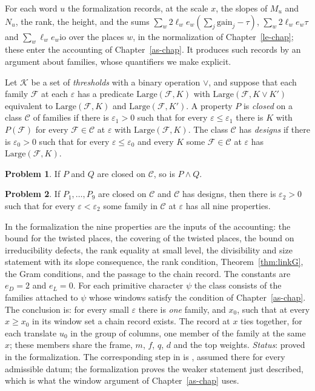 \documentclass[reqno]{amsart}
\newcounter{chap}
\theoremstyle{definition}
\newtheorem{problem}{Problem}[section]
\theoremstyle{plain}
\theoremstyle{remark}
\newcommand{\gain}{\mathrm{gain}}
\newcommand{\io}{\mathrm{io}}
\begin{document}
For each word \(u\) the formalization records, at the scale \(x\), the slopes of \(M_u\) and \(N_u\), the rank, the height, and the sums \(\sum_w2\ell_we_w(\sum_j\gain_j-\tau)\), \(\sum_w2\ell_we_w\tau\) and \(\sum_w\ell_we_w\io\) over the places \(w\), in the normalization of Chapter~\ref{le-chap}; these enter the accounting of Chapter~\ref{as-chap}.  It produces such records by an argument about families, whose quantifiers we make explicit.

Let \(\mathcal K\) be a set of \emph{thresholds} with a binary operation \(\vee\), and suppose that each family \(\mathcal F\) at each \(\varepsilon\) has a predicate \(\mathrm{Large}(\mathcal F,K)\) with \(\mathrm{Large}(\mathcal F,K\vee K')\) equivalent to \(\mathrm{Large}(\mathcal F,K)\) and \(\mathrm{Large}(\mathcal F,K')\).  A property \(P\) is \emph{closed} on a class \(\mathcal C\) of families if there is \(\varepsilon_1>0\) such that for every \(\varepsilon\le\varepsilon_1\) there is \(K\) with \(P(\mathcal F)\) for every \(\mathcal F\in\mathcal C\) at \(\varepsilon\) with \(\mathrm{Large}(\mathcal F,K)\).  The class \(\mathcal C\) has \emph{designs} if there is \(\varepsilon_0>0\) such that for every \(\varepsilon\le\varepsilon_0\) and every \(K\) some \(\mathcal F\in\mathcal C\) at \(\varepsilon\) has \(\mathrm{Large}(\mathcal F,K)\).

\begin{problem}\label{pr:closed-and}
If \(P\) and \(Q\) are closed on \(\mathcal C\), so is \(P\wedge Q\).
\end{problem}

\begin{problem}\label{pr:design}
If \(P_1,\dots,P_9\) are closed on \(\mathcal C\) and \(\mathcal C\) has designs, then there is \(\varepsilon_2>0\) such that for every \(\varepsilon<\varepsilon_2\) some family in \(\mathcal C\) at \(\varepsilon\) has all nine properties.
\end{problem}

In the formalization the nine properties are the inputs of the accounting: the bound for the twisted places, the covering of the twisted places, the bound on irreducibility defects, the rank equality at small level, the divisibility and size statement with its slope consequence, the rank condition, Theorem~\ref{thm:linkG}, the Gram conditions, and the passage to the chain record.  The constants are \(e_D=2\) and \(e_L=0\).  For each primitive character \(\psi\) the class consists of the families attached to \(\psi\) whose windows satisfy the condition of Chapter~\ref{as-chap}.  The conclusion is: for every small \(\varepsilon\) there is \emph{one} family, and \(x_0\), such that at every \(x\ge x_0\) in its window set a chain record exists.  The record at \(x\) ties together, for each translate \(u_0\) in the group of columns, one member of the family at the same \(x\); these members share the frame, \(m\), \(f\), \(q\), \(d\) and the top weights.  \emph{Status}: proved in the formalization.  The corresponding step in \cite{Adr} is \cite[Hyp.~18.10]{Adr}, assumed there for every admissible datum; the formalization proves the weaker statement just described, which is what the window argument of Chapter~\ref{as-chap} uses.
\end{document}
